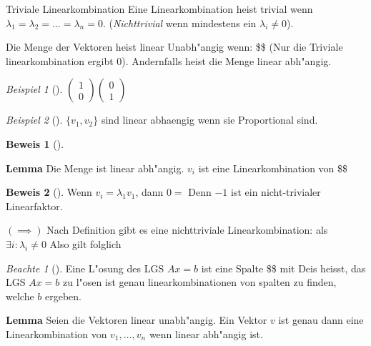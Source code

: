 \documentclass[11pt]{article}
\theoremstyle{remark}
\newtheorem{exa}{Beispiel}[section]
\newtheorem*{notte}{Beachte}
\theoremstyle{definition}
\newtheorem{prof}{Beweis}
\theoremstyle{remark}
\begin{document}
\begin{definition}{Triviale Linearkombination}{}
Eine Linearkombination heist trivial wenn \(\lambda_1 = \lambda_2 = ... =
\lambda_n = 0\). (\emph{Nichttrivial} wenn mindestens ein \(\lambda_i\not= 0\)).
\end{definition}


\begin{definition}{}{}
Die Menge der Vektoren heist linear Unabh"angig wenn: \$\$ (Nur die Triviale
linearkombination ergibt 0). Andernfalls heist die Menge linear abh"angig.
\end{definition}

\begin{exa}[] \label{}
\(\begin{pmatrix}1\\0\end{pmatrix}\begin{pmatrix}0\\1\end{pmatrix}\)
\end{exa}

\begin{exa}[] \label{}
\(\{v_1,v_2\}\) sind linear abhaengig wenn sie Proportional sind.

\begin{prof}[] \label{}

\end{prof}
\end{exa}

\textbf{Lemma} Die Menge ist linear abh"angig. \(v_i\) ist eine Linearkombination von \$\$

\begin{prof}[] \label{}
Wenn \(v_i=\lambda_1 v_1\), dann \(0=\) Denn \(-1\) ist ein nicht-trivialer
Linearfaktor.

\((\implies)\) Nach Definition gibt es eine nichttriviale Linearkombination: als
\(\exists i : \lambda_i \not= 0\) Also gilt  folglich 
\end{prof}

\begin{notte}[] \label{}
Eine L"osung des LGS \(Ax=b\) ist eine Spalte \$\$ mit 
Deis heisst, das LGS \(Ax=b\) zu l"osen ist genau linearkombinationen von spalten
zu finden, welche \(b\) ergeben.
\end{notte}

\textbf{Lemma} Seien die Vektoren linear unabh"angig. Ein Vektor \(v\) ist genau dann
eine Linearkombination von \(v_1,...,v_n\) wenn linear abh"angig ist.
\end{document}
